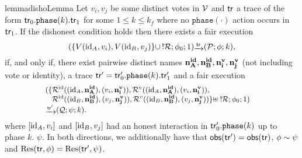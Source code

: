 \begin{restatable}{lemma}{dishoLemma}
\label{lem:cf}
Let $v_i,v_j$ be some distinct votes in $\mathcal{V}$ and $\mathsf{tr}$ a trace
of the form
$\mathsf{tr}_0.\mathtt{phase}(k).\mathsf{tr}_1$ for some $1\le k\le k_f$
where no $\mathtt{phase}(\cdot)$ action occurs in
$\mathsf{tr}_1$.
If the dishonest condition holds then
there exists a fair execution
$$(\{V(\id_A,v_i),V(\id_B,v_j)\}\cup\,!\roles;\phi_0;1)\sint{\tr}(\p;\phi;k),$$
if, and only if,
there exist pairwise distinct names ${\mathbf{n^{id}_{A}}},{\mathbf{n^{id}_{B}}},{\mathbf{n^{v}_{i}}},{\mathbf{n^{v}_{j}}}$ (not including vote or identity),
a trace $\mathsf{tr}'=\mathsf{tr}_0'.\mathtt{phase}(k).\mathsf{tr}_1'$ and a fair execution
$$
\begin{small}
  \begin{array}{ll}
    (\{
    \roles^\id((\id_A,\nID{A}),(v_i,\nV{i})),
    \roles^v((\id_A,\nID{A}),(v_i,\nV{i})),&\\
    \ \ \>\roles^\id((\id_B,\nID{B}),(v_j,\nV{j})),
    \roles^v((\id_B,\nID{B}),(v_j,\nV{j}))
    \}\uplus\;!\roles;
    \phi_0;1)\\
    \sint{\tr'}
    (\q;\psi;k).
  \end{array}
\end{small}
$$
where  $[\mathrm{id}_A,v_i]$ and $[\mathrm{id}_B,v_j]$ had an honest interaction in $\mathsf{tr}_0'.\mathtt{phase}(k)$ up to phase $k$.
$\psi$. %
In both directions, we additionally have that $\mathsf{obs}(\mathsf{tr}')=\mathsf{obs}(\mathsf{tr})$, $\phi\sim\psi$
and $\mathrm{Res}(\mathsf{tr},\phi)=\mathrm{Res}(\mathsf{tr}',\psi)$.
\end{restatable}
